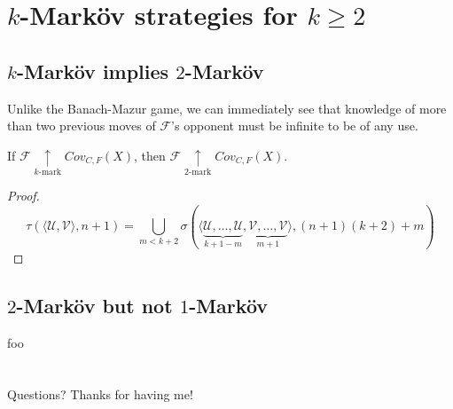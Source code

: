 \documentclass{beamer}
\theoremstyle{definition}
\newcommand{\kmarkwin}[1]{\underset{#1\text{-mark}}{\uparrow}}
\newcommand{\mengame}[1]{Cov_{C,F}(#1)}
\newcommand{\<}{\langle}
\renewcommand{\>}{\rangle}
\newcommand{\mc}[1]{\mathcal{#1}}
\newcommand{\pl}[1]{\mathscr{#1}}
\begin{document}
\section{$k$-Mark\"ov strategies for $k\geq 2$}

\subsection{$k$-Mark\"ov implies $2$-Mark\"ov}

\begin{frame}
  Unlike the Banach-Mazur game, we can immediately see that knowledge
  of more than two previous moves of $\pl F$'s opponent must be infinite
  to be of any use.

  \begin{theorem}
    If $\pl F \kmarkwin{k}\mengame X$, then $\pl F \kmarkwin2\mengame X$.
  \end{theorem}

  \begin{proof}
    \[
      \tau(\<\mc U,\mc V\>,n+1)
        =
      \bigcup_{m<k+2}
        \sigma(\<
          \underbrace{\mc U,\dots,\mc U}_{k+1-m},
          \underbrace{\mc V,\dots,\mc V}_{m+1}
        \>,(n+1)(k+2)+m)
    \]
  \end{proof}
\end{frame}

\subsection{$2$-Mark\"ov but not $1$-Mark\"ov}

\begin{frame}
  foo
\end{frame}

\section*{}

\begin{frame}
Questions? Thanks for having me!
\end{frame}
\end{document}
